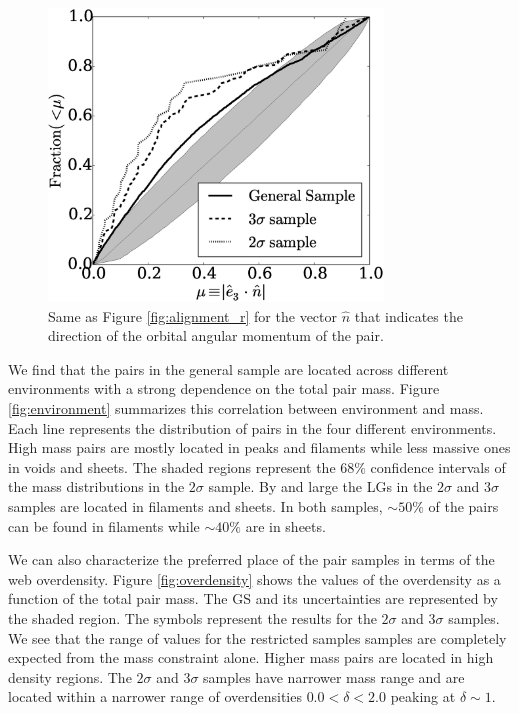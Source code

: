 \documentclass{iau}
\begin{document}
\begin{figure}[b]
\begin{center}
 \includegraphics[width=3.5in]{alignments_e3_n_all_environments.eps} 
 \caption{Same as Figure \ref{fig:alignment_r} for the vector $\hat
   n$ that indicates the direction of the orbital angular momentum of
   the pair.}
   \label{fig:alignment_n}
\end{center}
\end{figure}


We find that the pairs in the general sample are located across
different environments with a strong dependence on  the total pair
mass.  Figure \ref{fig:environment} summarizes this correlation between
environment and mass. Each line represents the 
distribution of pairs in the four different environments. High mass
pairs are mostly located in peaks and filaments while less massive
ones in voids and sheets.  The shaded regions represent the $68\%$
confidence intervals of the mass distributions in the $2\sigma$ 
sample. By and large the LGs in the $2\sigma$ and $3\sigma$ samples are
located in filaments and sheets. In both samples, $\sim 50\%$ of the
pairs can be found in filaments while $\sim 40\%$ are in sheets. 

We can also characterize the preferred place of the pair samples in terms of the
web overdensity.  Figure \ref{fig:overdensity} shows the values of the
overdensity as a function of the total pair mass. The GS and its
uncertainties are represented by the shaded region. The symbols represent the results for the $2\sigma$ and $3\sigma$ samples.   
We see that the range of values for the restricted samples
samples are completely expected from the mass constraint alone. Higher
mass pairs are located in high density regions. The $2\sigma$ and
$3\sigma$ samples have narrower mass range and are located within a
narrower range of overdensities $0.0<\delta<2.0$ peaking at $\delta \sim 1$. 
\end{document}
